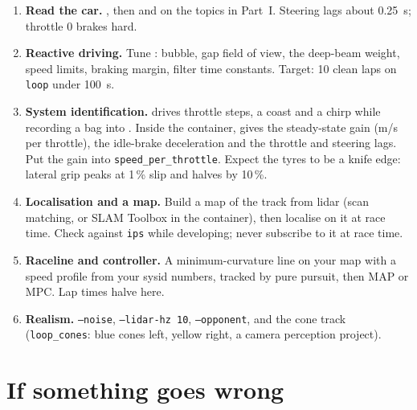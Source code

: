 \documentclass[11pt,a4paper]{article}
\begin{document}
\begin{enumerate}
  \item \textbf{Read the car.} , then  and  on the topics in Part~I. Steering lags about 0.25~s; throttle 0 brakes hard.
  \item \textbf{Reactive driving.} Tune : bubble, gap field of view, the deep-beam weight, speed limits, braking margin, filter time constants. Target: 10 clean laps on \texttt{loop} under 100~s.
  \item \textbf{System identification.}  drives throttle steps, a coast and a chirp while recording a bag into . Inside the container,  gives the steady-state gain (m/s per throttle), the idle-brake deceleration and the throttle and steering lags. Put the gain into \texttt{speed\_per\_throttle}. Expect the tyres to be a knife edge: lateral grip peaks at 1\,\% slip and halves by 10\,\%.
  \item \textbf{Localisation and a map.} Build a map of the track from lidar (scan matching, or SLAM Toolbox in the container), then localise on it at race time. Check against \texttt{ips} while developing; never subscribe to it at race time.
  \item \textbf{Raceline and controller.} A minimum-curvature line on your map with a speed profile from your sysid numbers, tracked by pure pursuit, then MAP or MPC. Lap times halve here.
  \item \textbf{Realism.} \texttt{--noise}, \texttt{--lidar-hz 10}, \texttt{--opponent}, and the cone track (\texttt{loop\_cones}: blue cones left, yellow right, a camera perception project).
\end{enumerate}

\section{If something goes wrong}
\end{document}
